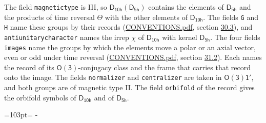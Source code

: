 \documentclass[10pt,a4paper]{article}
\newcommand{\needspace}[1]{\par\penalty-100\begingroup\dimen0=#1\relax\dimen2=\pagegoal
  \advance\dimen2-\pagetotal\ifdim\dimen0>\dimen2\relax\ifdim\dimen2>0pt\vfil\break\fi\fi
  \endgroup}
\numberwithin{equation}{section}
\newcommand{\grp}[1]{\mathsf{#1}}
\begin{document}
The field \texttt{magnetictype} is III, so $\grp{D_{10h}}(\grp{D_{5h}})$ contains the elements of $\grp{D_{5h}}$ and the products of time reversal $\varTheta$ with the other elements of $\grp{D_{10h}}$. The fields \texttt{G} and \texttt{H} name these groups by their records (\href{../../CONVENTIONS.pdf}{CONVENTIONS.pdf}, section \href{../../CONVENTIONS.pdf\#conv.30.3}{30.3}), and \texttt{antiunitarycharacter} names the irrep $\chi$ of $\grp{D_{10h}}$ with kernel $\grp{D_{5h}}$. The four fields \texttt{images} name the groups by which the elements move a polar or an axial vector, even or odd under time reversal (\href{../../CONVENTIONS.pdf}{CONVENTIONS.pdf}, section \href{../../CONVENTIONS.pdf\#conv.31.2}{31.2}). Each names the record of its $\grp{O(3)}$-conjugacy class and the frame that carries that record onto the image. The fields \texttt{normalizer} and \texttt{centralizer} are taken in $\grp{O(3)1'}$, and both groups are of magnetic type II. The field \texttt{orbifold} of the record gives the orbifold symbols of $\grp{D_{10h}}$ and of $\grp{D_{5h}}$.
\needspace{103pt}
\end{document}
